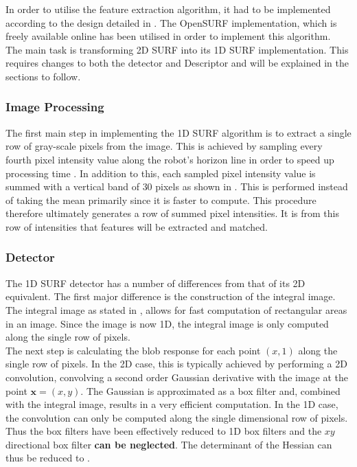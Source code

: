 \documentclass{article}
\begin{document}
In order to utilise the feature extraction algorithm, it had to be implemented according to the design detailed in \cite{Anderson}. The OpenSURF implementation, which is freely available online \cite{opensurf} has been utilised in order to implement this algorithm.\\

The main task is transforming 2D SURF into its 1D SURF implementation. This requires changes to both the detector and Descriptor and will be explained in the sections to follow.\\

\subsubsection{Image Processing}
\label{sec:imageProcessing}
The first main step in implementing the 1D SURF algorithm is to extract a single row of gray-scale pixels from the image. This is achieved by sampling every fourth pixel intensity value along the robot's horizon line in order to speed up processing time \cite{Anderson}. 
In addition to this, each sampled pixel intensity value is summed with a vertical band of $30$ pixels as shown in . This is performed instead of taking the mean primarily since it is faster to compute. This procedure therefore ultimately generates a row of summed pixel intensities. It is from this row of intensities that features will be extracted and matched.\\

\subsubsection{Detector}
\label{sec:1dsurfDetect}
The 1D SURF detector has a number of differences from that of its 2D equivalent. The first major difference is the construction of the integral image. The integral image as stated in , allows for fast computation of rectangular areas in an image. Since the image is now 1D, the integral image is only computed along the single row of pixels.\\ 

The next step is calculating the blob response for each point $(x,1)$ along the single row of pixels. In the 2D case, this is typically achieved by performing a 2D convolution, convolving a second order Gaussian derivative with the image at the point $\textbf{x} = (x,y)$. The Gaussian is approximated as a box filter and, combined with the integral image, results in a very efficient computation. In the 1D case, the convolution can only be computed along the single dimensional row of pixels. Thus the box filters have been effectively reduced to 1D box filters and the $xy$ directional box filter \textbf{can be neglected}. The determinant of the Hessian can thus be reduced to .\\
\end{document}
